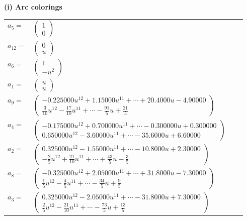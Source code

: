 \documentclass[1p]{elsarticle_modified}
\theoremstyle{definition}
\begin{document}
\flushleft \textbf{(i) Arc colorings}\\
\begin{tabular}{m{7pt} m{180pt} m{7pt} m{180pt} }
\flushright $a_{5}=$&$\begin{pmatrix}1\\0\end{pmatrix}$ \\
\flushright $a_{12}=$&$\begin{pmatrix}0\\u\end{pmatrix}$ \\
\flushright $a_{6}=$&$\begin{pmatrix}1\\- u^2\end{pmatrix}$ \\
\flushright $a_{1}=$&$\begin{pmatrix}u\\u\end{pmatrix}$ \\
\flushright $a_{9}=$&$\begin{pmatrix}-0.225000 u^{12}+1.15000 u^{11}+\cdots+20.4000 u-4.90000\\\frac{3}{10} u^{12}-\frac{17}{10} u^{11}+\cdots-\frac{91}{5} u+\frac{21}{5}\end{pmatrix}$ \\
\flushright $a_{4}=$&$\begin{pmatrix}-0.175000 u^{12}+0.700000 u^{11}+\cdots-0.300000 u+0.300000\\0.650000 u^{12}-3.60000 u^{11}+\cdots-35.6000 u+6.60000\end{pmatrix}$ \\
\flushright $a_{2}=$&$\begin{pmatrix}0.325000 u^{12}-1.55000 u^{11}+\cdots-10.8000 u+2.30000\\-\frac{2}{5} u^{12}+\frac{21}{10} u^{11}+\cdots+\frac{43}{5} u-\frac{3}{5}\end{pmatrix}$ \\
\flushright $a_{8}=$&$\begin{pmatrix}-0.325000 u^{12}+2.05000 u^{11}+\cdots+31.8000 u-7.30000\\\frac{1}{5} u^{12}-\frac{4}{5} u^{11}+\cdots-\frac{34}{5} u+\frac{9}{5}\end{pmatrix}$ \\
\flushright $a_{3}=$&$\begin{pmatrix}0.325000 u^{12}-2.05000 u^{11}+\cdots-31.8000 u+7.30000\\\frac{2}{5} u^{12}-\frac{21}{10} u^{11}+\cdots-\frac{73}{5} u+\frac{13}{5}\end{pmatrix}$ \\

\end{tabular}
\end{document}
